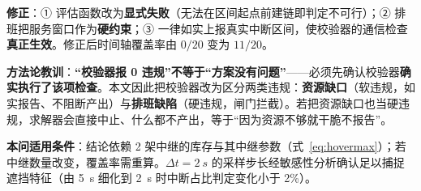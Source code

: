 \textbf{修正}：① 评估函数改为\textbf{显式失败}（无法在区间起点前建链即判定不可行）；② 排班把服务窗口作为\textbf{硬约束}；③ 一律如实上报真实中断区间，使校验器的通信检查\textbf{真正生效}。修正后时间轴覆盖率由 $0/20$ 变为 $11/20$。

\textbf{方法论教训}：\textbf{“校验器报 0 违规”不等于“方案没有问题”}——必须先确认校验器\textbf{确实执行了该项检查}。本文因此把校验器改为区分两类违规：\textbf{资源缺口}（软违规，如实报告、不阻断产出）与\textbf{排班缺陷}（硬违规，闸门拦截）。若把资源缺口也当硬违规，求解器会直接中止、什么都不产出，等于“因为资源不够就干脆不报告”。

\textbf{本问适用条件}：结论依赖 2 架中继的库存与其中继参数（式~\eqref{eq:hovermax}）；若中继数量改变，覆盖率需重算。$\Delta t=\SI{2}{s}$ 的采样步长经敏感性分析确认足以捕捉遮挡特征（由 \SI{5}{s} 细化到 \SI{2}{s} 时中断占比判定变化小于 2\%）。

